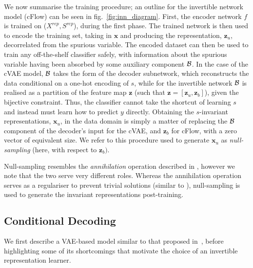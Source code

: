 We now summarise the training procedure; an outline for the invertible network model (cFlow) can be
seen in fig.~\ref{fig:inn_diagram}.
%
First, the encoder network $f$ is trained on ($X^{rep}, S^{rep}$), during the first
phase.
%
The trained network is then used to encode the training set, taking in $\bm{x}$ and producing the
representation, $\bm{z}_u$, decorrelated from the spurious variable.
%
The encoded dataset can then be used to train any off-the-shelf classifier safely, with information
about the spurious variable having been absorbed by some auxiliary component ${\mathcal{B}}$.
%
In the case of the \acf{cVAE} model, ${\mathcal{B}}$ takes the form of the decoder subnetwork, which
reconstructs the data conditional on a one-hot encoding of $s$, while for the invertible network
${\mathcal{B}}$ is realised as a partition of the feature map $\bm{z}$ (such that $\bm{z} =
[\bm{z}_u, \bm{z}_b]$), given the bijective constraint.
%
Thus, the classifier cannot take the shortcut of learning $s$ and instead must learn how to predict
$y$ directly.
%
Obtaining the $s$-invariant representations, $\bm{x}_u$, in the data domain is simply a matter of
replacing the ${\mathcal{B}}$ component of the decoder's input for the cVAE, and $\bm{z}_b$ for
cFlow, with a zero vector of equivalent size.
%
We refer to this procedure used to generate $\bm{x}_u$ as \emph{null-sampling} (here, with respect to $\bm{z}_b)$.

Null-sampling resembles the \emph{annihilation} operation described in \citet{xiao2017dna}, however
we note that the two serve very different roles.  
%
Whereas the annihilation operation serves as a regulariser to prevent trivial solutions (similar to
\cite{jaiswal2018unsupervised}), null-sampling is used to generate the invariant representations
post-training.

\subsection{Conditional Decoding}%
\label{conddec}
\noindent We first describe a VAE-based model similar to that proposed
in~\citet{madras2018learning}, before highlighting some of its shortcomings that motivate the
choice of an invertible representation learner.


